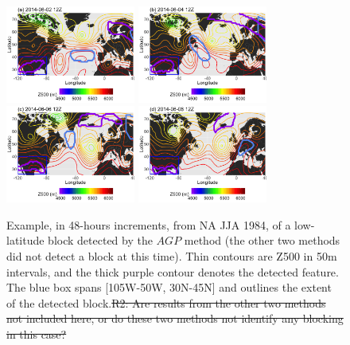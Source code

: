 \documentclass[smallextended]{svjour3}       %
\numberwithin{equation}{section}
\begin{document}
\begin{figure}
\centering
\includegraphics[width=0.38\textwidth]{fig10a}
\includegraphics[width=0.38\textwidth]{fig10b}\\
\includegraphics[width=0.38\textwidth]{fig10c}
\includegraphics[width=0.38\textwidth]{fig10d}
\caption{Example, in 48-hours increments, from NA JJA 1984, of a low-latitude block detected by the $AGP$ method{ \color{blue}(the other two methods did not detect a block at this time)}. Thin contours are Z500 in 50m intervals, and the thick purple contour denotes the detected feature. The blue box spans [105W-50W, 30N-45N] and outlines the extent of the detected block.{\color{teal}\sout{R2: Are results from the other two methods not included here, or do these two methods not identify any blocking in this case?}}}\label{lowlatjja}
\end{figure} 
\end{document}
